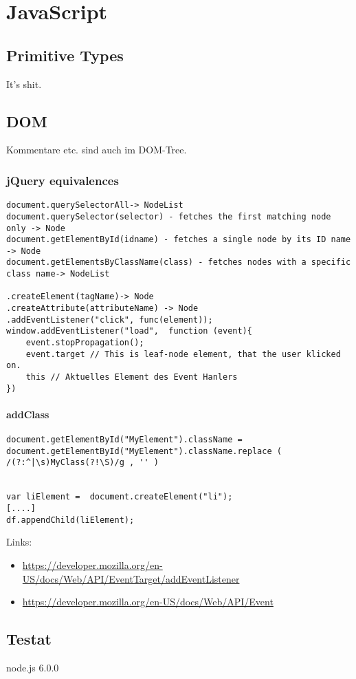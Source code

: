 \section{JavaScript}

\subsection{Primitive Types}
It's shit.


\subsection{DOM}

Kommentare etc. sind auch im DOM-Tree.


\subsubsection{jQuery equivalences}

\begin{verbatim}
document.querySelectorAll-> NodeList
document.querySelector(selector) - fetches the first matching node only -> Node
document.getElementById(idname) - fetches a single node by its ID name -> Node
document.getElementsByClassName(class) - fetches nodes with a specific class name-> NodeList

.createElement(tagName)-> Node
.createAttribute(attributeName) -> Node
.addEventListener("click", func(element));
window.addEventListener("load",  function (event){
	event.stopPropagation();
	event.target // This is leaf-node element, that the user klicked on.
	this // Aktuelles Element des Event Hanlers
})

\end{verbatim}

\paragraph{addClass}

\begin{verbatim}
document.getElementById("MyElement").className = document.getElementById("MyElement").className.replace ( /(?:^|\s)MyClass(?!\S)/g , '' )


var liElement =  document.createElement("li");
[....]
df.appendChild(liElement);
\end{verbatim}

Links:
\begin{itemize}
	\item \url{https://developer.mozilla.org/en-US/docs/Web/API/EventTarget/addEventListener}
	\item \url{https://developer.mozilla.org/en-US/docs/Web/API/Event}
\end{itemize}

\subsection{Testat}

node.js 6.0.0



